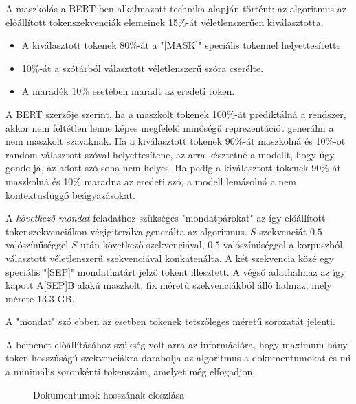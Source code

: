 A maszkolás a BERT-ben alkalmazott technika alapján történt: az algoritmus az előállított tokenszekvenciák elemeinek 15\%-át véletlenszerűen kiválasztotta. 
\begin{itemize}
	\item A kiválasztott tokenek 80\%-át a "[MASK]" speciális tokennel helyettesítette. 
	\item 10\%-át a szótárból választott véletlenszerű szóra cserélte.
	\item A maradék 10\% esetében maradt az eredeti token.
\end{itemize}

A BERT szerzője szerint, ha a maszkolt tokenek 100\%-át prediktálná a rendszer, akkor nem feltétlen lenne képes megfelelő minőségű reprezentációt generálni a nem maszkolt szavaknak. Ha a kiválasztott tokenek 90\%-át maszkolná és 10\%-ot random választott szóval helyettesítene, az arra késztetné a modellt, hogy úgy gondolja, az adott szó soha nem helyes. Ha pedig a kiválasztott tokenek 90\%-át maszkolná és 10\% maradna az eredeti szó, a modell lemásolná a nem kontextusfüggő beágyazásokat. \cite{bertappendix}

A \textit{következő mondat} feladathoz szükséges "mondatpárokat" az így előállított tokenszekvenciákon végigiterálva generálta az algoritmus. $S$ szekvenciát $0.5$ valószínűséggel $S$ után következő szekvenciával, $0.5$ valószínűséggel a korpuszból választott véletlenszerű szekvenciával konkatenálta. A két szekvencia közé egy speciális "[SEP]" mondathatárt jelző tokent illesztett. A végső adathalmaz az így kapott A[SEP]B alakú maszkolt, fix méretű szekvenciákból álló halmaz, mely mérete $13.3$ GB.

\begin{note}
A "mondat" szó ebben az esetben tokenek tetszőleges méretű sorozatát jelenti.
\end{note}
 
A bemenet előállításához szükség volt arra az információra, hogy maximum hány token hosszúságú szekvenciákra darabolja az algoritmus a dokumentumokat és mi a minimális soronkénti tokenszám, amelyet még elfogadjon.

\begin{figure}[H]
	\centering
	\hspace{5pt}
	\caption{Dokumentumok hosszának eloszlása}
	\label{fig:doc_lengths}
\end{figure}

